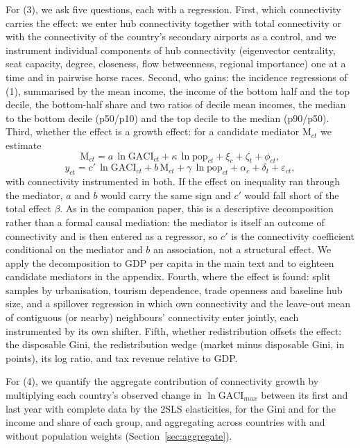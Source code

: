 For (3), we ask five questions, each with a regression. First, which connectivity carries the effect: we enter hub connectivity together with total connectivity or with the connectivity of the country's secondary airports as a control, and we instrument individual components of hub connectivity (eigenvector centrality, seat capacity, degree, closeness, flow betweenness, regional importance) one at a time and in pairwise horse races. Second, who gains: the incidence regressions of (1), summarised by the mean income, the income of the bottom half and the top decile, the bottom-half share and two ratios of decile mean incomes, the median to the bottom decile (p50/p10) and the top decile to the median (p90/p50). Third, whether the effect is a growth effect: for a candidate mediator $\mathrm{M}_{ct}$ we estimate
\begin{equation}
\mathrm{M}_{ct} = a\,\ln\mathrm{GACI}_{ct} + \kappa\,\ln\text{pop}_{ct} + \xi_c + \zeta_t + \phi_{ct},
\label{eq:mec1}
\end{equation}
\begin{equation}
y_{ct} = c'\,\ln\mathrm{GACI}_{ct} + b\,\mathrm{M}_{ct} + \gamma\,\ln\text{pop}_{ct} + \alpha_c + \delta_t + \varepsilon_{ct},
\label{eq:mec2}
\end{equation}
with connectivity instrumented in both. If the effect on inequality ran through the mediator, $a$ and $b$ would carry the same sign and $c'$ would fall short of the total effect $\beta$. As in the companion paper, this is a descriptive decomposition rather than a formal causal mediation: the mediator is itself an outcome of connectivity and is then entered as a regressor, so $c'$ is the connectivity coefficient conditional on the mediator and $b$ an association, not a structural effect. We apply the decomposition to GDP per capita in the main text and to eighteen candidate mediators in the appendix. Fourth, where the effect is found: split samples by urbanisation, tourism dependence, trade openness and baseline hub size, and a spillover regression in which own connectivity and the leave-out mean of contiguous (or nearby) neighbours' connectivity enter jointly, each instrumented by its own shifter. Fifth, whether redistribution offsets the effect: the disposable Gini, the redistribution wedge (market minus disposable Gini, in points), its log ratio, and tax revenue relative to GDP.

For (4), we quantify the aggregate contribution of connectivity growth by multiplying each country's observed change in $\ln\mathrm{GACI}_{max}$ between its first and last year with complete data by the 2SLS elasticities, for the Gini and for the income and share of each group, and aggregating across countries with and without population weights (Section~\ref{sec:aggregate}).

